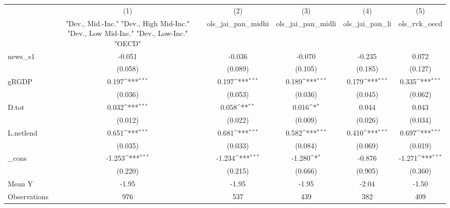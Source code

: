 {
\def\sym#1{\ifmmode^{#1}\else\(^{#1}\)\fi}
\begin{tabular}{l*{5}{c}}
\toprule
            &\multicolumn{1}{c}{(1)}&\multicolumn{1}{c}{(2)}&\multicolumn{1}{c}{(3)}&\multicolumn{1}{c}{(4)}&\multicolumn{1}{c}{(5)}\\
            &\multicolumn{1}{c}{ "Dev., Mid.-Inc." "Dev., High Mid-Inc." "Dev., Low Mid-Inc." "Dev., Low-Inc." "OECD" }&\multicolumn{1}{c}{ols\_jai\_pan\_midhi}&\multicolumn{1}{c}{ols\_jai\_pan\_midli}&\multicolumn{1}{c}{ols\_jai\_pan\_li}&\multicolumn{1}{c}{ols\_rvk\_oecd}\\
\midrule
news\_s1     &      -0.051         &      -0.036         &      -0.070         &      -0.235         &       0.072         \\
            &     (0.058)         &     (0.089)         &     (0.105)         &     (0.185)         &     (0.127)         \\
\addlinespace
gRGDP       &       0.197\sym{***}&       0.197\sym{***}&       0.189\sym{***}&       0.179\sym{***}&       0.335\sym{***}\\
            &     (0.036)         &     (0.053)         &     (0.036)         &     (0.045)         &     (0.062)         \\
\addlinespace
D.tot       &       0.032\sym{***}&       0.058\sym{**} &       0.016\sym{*}  &       0.044         &       0.043         \\
            &     (0.012)         &     (0.022)         &     (0.009)         &     (0.026)         &     (0.034)         \\
\addlinespace
L.netlend   &       0.651\sym{***}&       0.681\sym{***}&       0.582\sym{***}&       0.410\sym{***}&       0.697\sym{***}\\
            &     (0.035)         &     (0.033)         &     (0.084)         &     (0.069)         &     (0.019)         \\
\addlinespace
\_cons      &      -1.253\sym{***}&      -1.234\sym{***}&      -1.280\sym{*}  &      -0.876         &      -1.271\sym{***}\\
            &     (0.220)         &     (0.215)         &     (0.666)         &     (0.905)         &     (0.360)         \\
\midrule
Mean Y      &       -1.95         &       -1.95         &       -1.95         &       -2.04         &       -1.50         \\
Observations&         976         &         537         &         439         &         382         &         409         \\
\bottomrule
\end{tabular}
}
